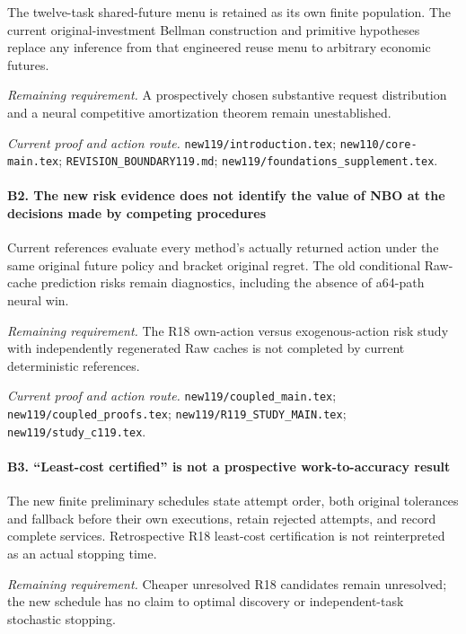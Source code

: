 The twelve-task shared-future menu is retained as its own finite population. The current original-investment Bellman construction and primitive hypotheses replace any inference from that engineered reuse menu to arbitrary economic futures.

\par\emph{Remaining requirement.} A prospectively chosen substantive request distribution and a neural competitive amortization theorem remain unestablished.

\par\emph{Current proof and action route.} \nolinkurl{new119/introduction.tex}; \nolinkurl{new110/core-main.tex}; \nolinkurl{REVISION_BOUNDARY119.md}; \nolinkurl{new119/foundations_supplement.tex}.

\paragraph{B2. The new risk evidence does not identify the value of NBO at the decisions made by competing procedures}

Current references evaluate every method's actually returned action under the same original future policy and bracket original regret. The old conditional Raw-cache prediction risks remain diagnostics, including the absence of a64-path neural win.

\par\emph{Remaining requirement.} The R18 own-action versus exogenous-action risk study with independently regenerated Raw caches is not completed by current deterministic references.

\par\emph{Current proof and action route.} \nolinkurl{new119/coupled_main.tex}; \nolinkurl{new119/coupled_proofs.tex}; \nolinkurl{new119/R119_STUDY_MAIN.tex}; \nolinkurl{new119/study_c119.tex}.

\paragraph{B3. “Least-cost certified” is not a prospective work-to-accuracy result}

The new finite preliminary schedules state attempt order, both original tolerances and fallback before their own executions, retain rejected attempts, and record complete services. Retrospective R18 least-cost certification is not reinterpreted as an actual stopping time.

\par\emph{Remaining requirement.} Cheaper unresolved R18 candidates remain unresolved; the new schedule has no claim to optimal discovery or independent-task stochastic stopping.

